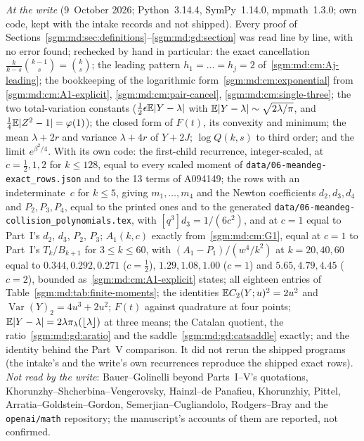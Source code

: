 \documentclass[11pt,letterpaper]{article}
\theoremstyle{remark}\newtheorem{remark}[theorem]{Remark}
\newcommand{\file}[1]{\nolinkurl{#1}}
\theoremstyle{definition}\newtheorem{definition}[theorem]{Definition}
\begin{document}
\emph{At the write} (9~October 2026; Python~3.14.4, SymPy~1.14.0,
mpmath~1.3.0; own code, kept with the intake records and not shipped). Every
proof of Sections~\ref{sgm:md:sec:definitions}--\ref{sgm:md:gd:section} was
read line by line, with no error found; rechecked by hand in particular: the
exact cancellation $\frac k{k-s}\binom{k-1}s=\binom ks$; the leading pattern
$h_1=\dots=h_j=2$ of~\eqref{sgm:md:cm:Aj-leading}; the bookkeeping of the
logarithmic form~\eqref{sgm:md:cm:exponential} from
\eqref{sgm:md:cm:A1-explicit}, \eqref{sgm:md:cm:pair-cancel},
\eqref{sgm:md:cm:single-three}; the two total-variation constants
($\frac12\epsilon\mathbb E|Y-\lambda|$ with $\mathbb E|Y-\lambda|\sim\sqrt{2\lambda/\pi}$,
and $\frac14\mathbb E|Z^2-1|=\varphi(1)$); the closed form of $F(t)$, its convexity
and minimum; the mean $\lambda+2r$ and variance $\lambda+4r$ of $Y+2J$;
$\log Q(k,s)$ to third order; and the limit $e^{\beta^2/4}$. With its own
code: the first-child recurrence, integer-scaled, at $c=\frac12,1,2$ for
$k\le128$, equal to every scaled moment of
\file{data/06-meandeg-exact_rows.json} and to the 13 terms of A094149; the
rows with an indeterminate~$c$ for $k\le5$, giving $m_1,\dots,m_4$ and the
Newton coefficients $d_2,d_3,d_4$ and $P_2,P_3,P_4$, equal to the printed
ones and to the generated \file{data/06-meandeg-collision_polynomials.tex},
with $[q^3]d_3=1/(6c^2)$, and at $c=1$ equal to Part~I's $d_2$, $d_3$, $P_2$,
$P_3$; $A_1(k,c)$ exactly from~\eqref{sgm:md:cm:G1}, equal at $c=1$ to Part~I's
$T_k/B_{k+1}$ for $3\le k\le60$, with $(A_1-P_1)/(w^4/k^2)$ at $k=20,40,60$
equal to $0.344,0.292,0.271$ ($c=\frac12$), $1.29,1.08,1.00$ ($c=1$) and
$5.65,4.79,4.45$ ($c=2$), bounded as~\eqref{sgm:md:cm:A1-explicit} states;
all eighteen entries of Table~\ref{sgm:md:tab:finite-moments}; the identities
$\mathbb E C_2(Y;u)^2=2u^2$ and $\operatorname{Var}(Y)_2=4u^3+2u^2$; $F(t)$ against
quadrature at four points; $\mathbb E|Y-\lambda|=2\lambda\pi_\lambda(\lfloor\lambda\rfloor)$
at three means; the Catalan quotient, the ratio~\eqref{sgm:md:gd:aratio} and
the saddle~\eqref{sgm:md:gd:catsaddle} exactly; and the identity behind the
Part~V comparison. It did not rerun the shipped programs (the intake's and
the write's own recurrences reproduce the shipped exact rows). \emph{Not read
by the write}: Bauer--Golinelli beyond Parts~I--V's quotations,
Khorunzhy--Shcherbina--Vengerovsky, Hainzl--de Panafieu, Khorunzhiy, Pittel,
Arratia--Goldstein--Gordon, Semerjian--Cugliandolo, Rodgers--Bray and the
\texttt{openai/math} repository; the manuscript's accounts of them are
reported, not confirmed.
\end{document}

